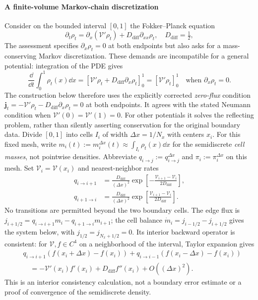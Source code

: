 \documentclass[12pt,a4paper,oneside]{book}
\begin{document}
\paragraph{A finite-volume Markov-chain discretization}
Consider on the bounded interval $[0,1]$ the Fokker--Planck equation
\begin{equation*}
\partial_t \rho_t=\partial_x(\mathcal V'\rho_t)+{D_{\mathrm{diff}}}\partial_{xx}\rho_t,\quad {D_{\mathrm{diff}}}=\tfrac12,
\end{equation*}
The assessment specifies $\partial_x\rho_t=0$ at both endpoints but also asks for a
mass-conserving Markov discretization. These demands are incompatible
for a general potential: integration of the PDE gives
\begin{equation*}
\frac{\dd}{\dd t}\int_0^1\rho_t(x)\dd x
 =[\mathcal V'\rho_t+D_{\mathrm{diff}}\partial_x\rho_t]_0^1=[\mathcal V'\rho_t]_0^1\quad\text{when }\partial_x\rho_t=0.
\end{equation*}
The construction below therefore uses the explicitly corrected
\emph{zero-flux} condition $\boldsymbol j_t=-\mathcal V'\rho_t-D_{\mathrm{diff}}\partial_x\rho_t=0$ at both endpoints.
It agrees with the stated Neumann condition when $\mathcal V'(0)=\mathcal V'(1)=0$.
For other potentials it solves the reflecting problem, rather than
silently asserting conservation for the original boundary data.
Divide $[0,1]$ into cells $I_i$ of width $\Delta x=1/N_x$ with centers $x_i$.
For this fixed mesh, write $m_i(t):=m_i^{\Delta x}(t)\approx\int_{I_i}\rho_t(x)\dd x$ for the semidiscrete \emph{cell masses}, not
pointwise densities. Abbreviate $q_{i\to j}:=q_{i\to j}^{\Delta x}$ and $\pi_i:=\pi_i^{\Delta x}$ on this mesh. Set $\mathcal V_i=\mathcal V(x_i)$ and nearest-neighbor rates
\begin{equation}
\begin{aligned}
 q_{i\to i+1}&=\frac{{D_{\mathrm{diff}}}}{(\Delta x)^2}
 \exp\left[-\frac{\mathcal V_{i+1}-\mathcal V_i}{2{D_{\mathrm{diff}}}}\right],\\
 q_{i+1\to i}&=\frac{{D_{\mathrm{diff}}}}{(\Delta x)^2}
 \exp\left[\frac{\mathcal V_{i+1}-\mathcal V_i}{2{D_{\mathrm{diff}}}}\right].
\end{aligned}
\label{eq:markovrates}
\end{equation}
No transitions are permitted beyond the two boundary cells.
The edge flux is $j_{i+1/2}=q_{i\to i+1}m_i-q_{i+1\to i}m_{i+1}$;
the cell balance $\dot m_i=j_{i-1/2}-j_{i+1/2}$ gives the system below,
with $j_{1/2}=j_{N_x+1/2}=0$. Its interior backward operator is consistent:
for $\mathcal V,f\in C^4$ on a neighborhood of the interval, Taylor expansion gives
\begin{equation*}
\begin{aligned}
&q_{i\to i+1}(f(x_i+\Delta x)-f(x_i))
 +q_{i\to i-1}(f(x_i-\Delta x)-f(x_i))\\
&\quad=-\mathcal V'(x_i)f'(x_i)+D_{\mathrm{diff}}f''(x_i)+O((\Delta x)^2).
\end{aligned}
\end{equation*}
This is an interior consistency calculation, not a boundary error estimate
or a proof of convergence of the semidiscrete density.
\end{document}
